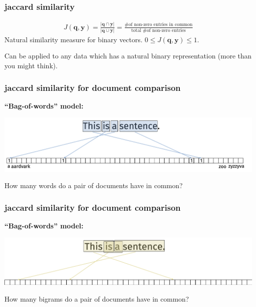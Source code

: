 \documentclass[compress]{beamer}
\newcommand{\bv}[1]{\mathbf{#1}}
\begin{document}
\begin{frame}
	\frametitle{jaccard similarity}
	\begin{definition}
			\begin{align*}
					J(\bv{q},\bv{y}) = \frac{|\bv{q} \cap \bv{y}|}{|\bv{q} \cup \bv{y}|} = \frac{\text{\# of non-zero entries in common}}{\text{total \# of non-zero entries}}
				\end{align*}
			Natural similarity measure for binary vectors. $0\leq J(\bv{q},\bv{y})\leq 1$.
		\end{definition}
	
	Can be applied to any data which has a natural binary representation (more than you might think). 
\end{frame}

\begin{frame}
	\frametitle{jaccard similarity for document comparison}
	\textbf{``Bag-of-words'' model:}
	\begin{center}
			\includegraphics[width=.95\textwidth]{bagofwords.png}
		\end{center}
	
	How many words do a pair of documents have in common?
\end{frame}

\begin{frame}
	\frametitle{jaccard similarity for document comparison}
	\textbf{``Bag-of-words'' model:}
	\begin{center}
			\includegraphics[width=.95\textwidth]{bigrams.png}
		\end{center}
	
	How many bigrams do a pair of documents have in common?
\end{frame}
\end{document}
